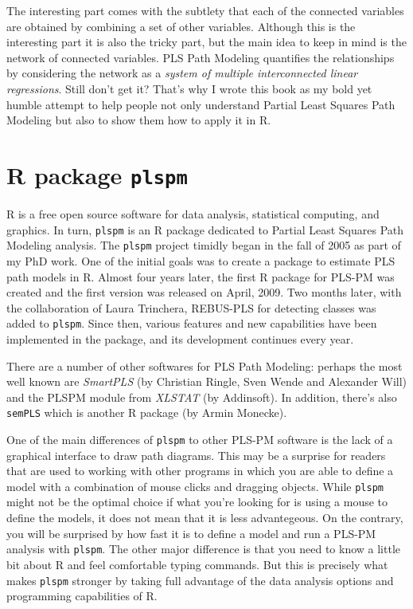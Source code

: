 \documentclass[12pt]{book}\usepackage{graphicx, color}
\newcommand{\plspm}{\texttt{plspm}}
\newcommand{\code}[1]{\texttt{#1}}
\begin{document}
The interesting part comes with the subtlety that each of the connected variables are obtained by combining a set of other variables. Although this is the interesting part it is also the tricky part, but the main idea to keep in mind is the network of connected variables. PLS Path Modeling quantifies the relationships by considering the network as a \textit{system of multiple interconnected linear regressions}. Still don't get it? That's why I wrote this book as my bold yet humble attempt to help people not only understand Partial Least Squares Path Modeling but also to show them how to apply it in R. 



\section{R package \plspm{}}
R is a free open source software for data analysis, statistical computing, and graphics. In turn, \plspm{} is an R package dedicated to Partial Least Squares Path Modeling analysis. The \plspm{} project timidly began in the fall of 2005 as part of my PhD work. One of the initial goals was to create a package to estimate PLS path models in R. Almost four years later, the first R package for PLS-PM was created and the first version was released on April, 2009. Two months later, with the collaboration of Laura Trinchera, REBUS-PLS for detecting classes was added to \plspm{}. Since then, various features and new capabilities have been implemented in the package, and its development continues every year.

There are a number of other softwares for PLS Path Modeling: perhaps the most well known are \textit{SmartPLS} (by Christian Ringle, Sven Wende and Alexander Will) and the PLSPM module from \textit{XLSTAT} (by Addinsoft). In addition, there's also \code{semPLS} which is another R package (by Armin Monecke). 

One of the main differences of \plspm{} to other PLS-PM software is the lack of a graphical interface to draw path diagrams. This may be a surprise for readers that are used to working with other programs in which you are able to define a model with a combination of mouse clicks and dragging objects. While \plspm{} might not be the optimal choice if what you're looking for is using a mouse to define the models, it does not mean that it is less advantegeous. On the contrary, you will be surprised by how fast it is to define a model and run a PLS-PM analysis with \plspm{}. The other major difference is that you need to know a little bit about R and feel comfortable typing commands. But this is precisely what makes \plspm{} stronger by taking full advantage of the data analysis options and programming capabilities of R. 
\end{document}

